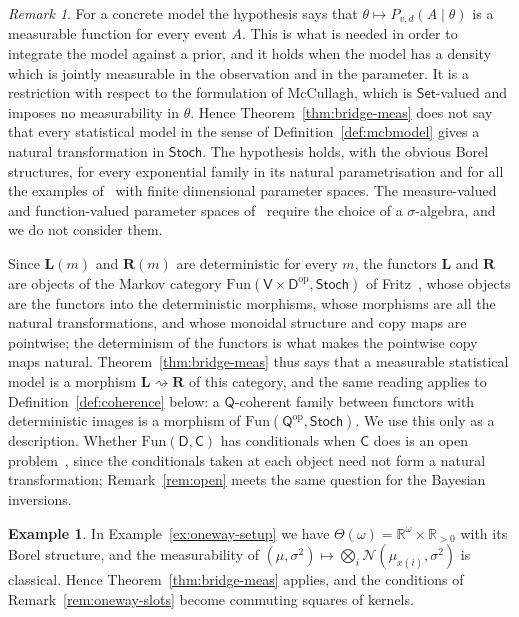 \documentclass[11pt,a4paper]{article}
\theoremstyle{plain}
\theoremstyle{definition}
\newtheorem{example}[theorem]{Example}
\theoremstyle{remark}
\newtheorem{remark}[theorem]{Remark}
\newcommand{\cat}[1]{\mathsf{#1}}
\newcommand{\catV}{\cat{V}}
\newcommand{\catD}{\cat{D}}
\newcommand{\Set}{\cat{Set}}
\newcommand{\Stoch}{\cat{Stoch}}
\newcommand{\op}{\mathrm{op}}
\newcommand{\R}{\mathbb{R}}
\newcommand{\Norm}{\mathcal{N}}
\begin{document}
\begin{remark}\label{rem:meas-hyp}
For a concrete model the hypothesis says that
$\theta \mapsto P_{v,d}(A \mid \theta)$ is a measurable function for every event
$A$. This is what is needed in order to integrate the model against a prior,
and it holds when the model has a density which is jointly measurable in the
observation and in the parameter. It is a restriction with respect to the
formulation of McCullagh, which is $\Set$-valued and imposes no measurability
in $\theta$.
Hence Theorem~\ref{thm:bridge-meas} does not say that every statistical model
in the sense of Definition~\ref{def:mcbmodel} gives a natural transformation
in $\Stoch$. The hypothesis holds, with the obvious Borel structures, for
every exponential family in its natural parametrisation and for all the
examples of~\cite{mccullagh_what_2002} with finite dimensional parameter
spaces. The measure-valued and function-valued parameter spaces
of~\cite[\S8]{mccullagh_what_2002} require the choice of a $\sigma$-algebra,
and we do not consider them.

Since $\mathbf{L}(m)$ and $\mathbf{R}(m)$ are deterministic for every $m$,
the functors $\mathbf{L}$ and $\mathbf{R}$ are objects of the Markov category
$\mathrm{Fun}(\catV\times\catD^{\op},\Stoch)$ of
Fritz~\cite[Prop.~7.1]{fritz_synthetic_2020}, whose objects are the functors
into the deterministic morphisms, whose morphisms are all the natural
transformations, and whose monoidal structure and copy maps are pointwise;
the determinism of the functors is what makes the pointwise copy maps
natural. Theorem~\ref{thm:bridge-meas} thus says that a measurable
statistical model is a morphism $\mathbf{L} \rightsquigarrow \mathbf{R}$ of
this category, and the same reading applies to Definition~\ref{def:coherence}
below: a $\cat{Q}$-coherent family between functors with deterministic
images is a morphism of $\mathrm{Fun}(\cat{Q}^{\op},\Stoch)$. We use this
only as a description. Whether $\mathrm{Fun}(\catD,\cat{C})$ has
conditionals when $\cat{C}$ does is an open
problem~\cite[Problem~11.9]{fritz_synthetic_2020}, since the conditionals
taken at each object need not form a natural transformation;
Remark~\ref{rem:open} meets the same question for the Bayesian inversions.
\end{remark}

\begin{example}\label{ex:oneway-cont}
In Example~\ref{ex:oneway-setup} we have $\Theta(\omega)=\R^\omega\times\R_{>0}$
with its Borel structure, and the measurability of
$(\mu,\sigma^2) \mapsto \bigotimes_i \Norm(\mu_{x(i)},\sigma^2)$ is classical.
Hence Theorem~\ref{thm:bridge-meas} applies, and the conditions of
Remark~\ref{rem:oneway-slots} become commuting squares of kernels.
\end{example}
\end{document}
